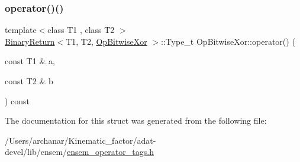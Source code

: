 \subsubsection{\texorpdfstring{operator()()}{operator()()}\hspace{0.1cm}{\footnotesize\ttfamily [3/3]}}
{\footnotesize\ttfamily template$<$class T1 , class T2 $>$ \\
\mbox{\hyperlink{structBinaryReturn}{Binary\+Return}}$<$T1, T2, \mbox{\hyperlink{structOpBitwiseXor}{Op\+Bitwise\+Xor}} $>$\+::Type\+\_\+t Op\+Bitwise\+Xor\+::operator() (\begin{DoxyParamCaption}\item[{const T1 \&}]{a,  }\item[{const T2 \&}]{b }\end{DoxyParamCaption}) const\hspace{0.3cm}{\ttfamily [inline]}}



The documentation for this struct was generated from the following file\+:\begin{DoxyCompactItemize}
\item 
/\+Users/archanar/\+Kinematic\+\_\+factor/adat-\/devel/lib/ensem/\mbox{\hyperlink{adat-devel_2lib_2ensem_2ensem__operator__tags_8h}{ensem\+\_\+operator\+\_\+tags.\+h}}\end{DoxyCompactItemize}
